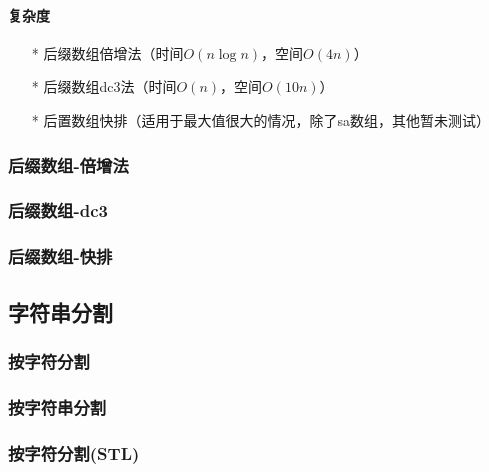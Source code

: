 \paragraph{复杂度}
\begin{itemize}
    \item[*] 后缀数组倍增法（时间$O(n\log n)$，空间$O(4n)$）
    \item[*] 后缀数组dc3法（时间$O(n)$，空间$O(10n)$）
    \item[*] 后置数组快排（适用于最大值很大的情况，除了sa数组，其他暂未测试）
\end{itemize}

\subsubsection{后缀数组-倍增法}


\subsubsection{后缀数组-dc3}


\subsubsection{后缀数组-快排}


\subsection{字符串分割}

\subsubsection{按字符分割}


\subsubsection{按字符串分割}


\subsubsection{按字符分割(STL)}

